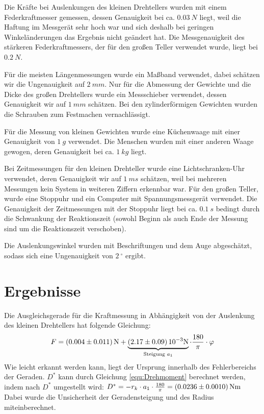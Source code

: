 \documentclass[a4paper,11pt]{article}
\begin{document}
Die Kräfte bei Auslenkungen des kleinen Drehtellers wurden mit einem Federkraftmesser gemessen, dessen Genauigkeit bei ca. $\SI{0.03}{N}$ liegt, weil die Haftung im Messgerät sehr hoch war und sich deshalb bei geringen Winkeländerungen das Ergebnis nicht geändert hat. Die Messgenauigkeit des stärkeren Federkraftmessers, der für den großen Teller verwendet wurde, liegt bei $\SI{0.2}{N}$.

Für die meisten Längenmessungen wurde ein Maßband verwendet, dabei schätzen wir die Ungenauigkeit auf $\SI{2}{mm}$. Nur für die Abmessung der Gewichte und die Dicke des großen Drehtellers wurde ein Messschieber verwendet, dessen Genauigkeit wir auf $\SI{1}{mm}$ schätzen. Bei den zylinderförmigen Gewichten wurden die Schrauben zum Festmachen vernachlässigt.

Für die Messung von kleinen Gewichten wurde eine Küchenwaage mit einer Genauigkeit von $\SI{1}{g}$ verwendet. Die Menschen wurden mit einer anderen Waage gewogen, deren Genauigkeit bei ca. $\SI{1}{kg}$ liegt.

Bei Zeitmessungen für den kleinen Drehteller wurde eine Lichtschranken-Uhr verwendet, deren Genauigkeit wir auf $\SI{1}{ms}$ schätzen, weil bei mehreren Messungen kein System in weiteren Ziffern erkennbar war. Für den großen Teller, wurde eine Stoppuhr und ein Computer mit Spannungsmessgerät verwendet. Die Genauigkeit der Zeitmessungen mit der Stoppuhr liegt bei ca. $\SI{0.1}{s}$ bedingt durch die Schwankung der Reaktionszeit (sowohl Beginn als auch Ende der Messung sind um die Reaktionszeit verschoben).

Die Auslenkungswinkel wurden mit Beschriftungen und dem Auge abgeschätzt, sodass sich eine Ungenauigkeit von $\SI{2}{^\circ}$ ergibt.

\section{Ergebnisse}

Die Ausgleichsgerade für die Kraftmessung in Abhängigkeit von der Auslenkung des kleinen Drehtellers hat folgende Gleichung:
\begin{equation}
F = \SI{0.004 \pm 0.011}{N} + \underbrace{\SI{2.17 \pm 0.09}{10^{-3}N}}_{\text{Steigung } a_1} \cdot \frac{180}{\pi} \cdot \varphi
\end{equation}
Wie leicht erkannt werden kann, liegt der Ursprung innerhalb des Fehlerbereichs der Geraden. $D^*$ kann durch Gleichung \ref{equ:Drehmoment} berechnet werden, indem nach $D^*$ umgestellt wird: $D^* = -r_k \cdot a_1 \cdot \frac{180}{\pi} = \SI{0.0236 \pm 0.0010}{Nm}$\\
Dabei wurde die Unsicherheit der Geradensteigung und des Radius miteinberechnet.
\end{document}
